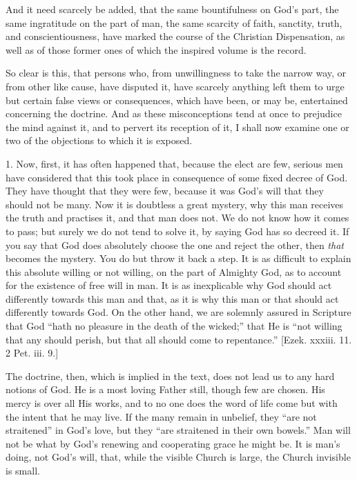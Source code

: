 And it need scarcely be added, that the same bountifulness on God's
part, the same ingratitude on the part of man, the same scarcity of
faith, sanctity, truth, and conscientiousness, have marked the course
of the Christian Dispensation, as well as of those former ones of
which the inspired volume is the record.

So clear is this, that persons who, from unwillingness to take the
narrow way, or from other like cause, have disputed it, have scarcely
anything left them to urge but certain false views or consequences,
which have been, or may be, entertained concerning the doctrine. And
as these misconceptions tend at once to prejudice the mind against it,
and to pervert its reception of it, I shall now examine one or two of
the objections to which it is exposed.

1. Now, first, it has often happened that, because the elect are
few, serious men have considered that this took place in consequence
of some fixed decree of God. They have thought that they were few,
because it was God's will that they should not be many. Now it is
doubtless a great mystery, why this man receives the truth and
practises it, and that man does not. We do not know how it comes to
pass; but surely we do not tend to solve it, by saying God has so
decreed it. If you say that God does absolutely choose the one and
reject the other, then \emph{that} becomes the mystery. You do but throw it
back a step. It is as difficult to explain this absolute willing or
not willing, on the part of Almighty God, as to account for the
existence of free will in man. It is as inexplicable why God should
act differently towards this man and that, as it is why this man or
that should act differently towards God. On the other hand, we are
solemnly assured in Scripture that God ``hath no pleasure in the
death of the wicked;'' that He is ``not willing that any
should perish, but that all should come to repentance.'' [Ezek.
xxxiii. 11. 2 Pet. iii. 9.]

The doctrine, then, which is implied in the text, does not lead us
to any hard notions of God. He is a most loving Father still, though
few are chosen. His mercy is over all His works, and to no one does
the word of life come but with the intent that he may live. If the
many remain in unbelief, they ``are not straitened'' in God's
love, but they ``are straitened in their own bowels.'' Man
will not be what by God's renewing and cooperating grace he might be.
It is man's doing, not God's will, that, while the visible Church is
large, the Church invisible is small.

